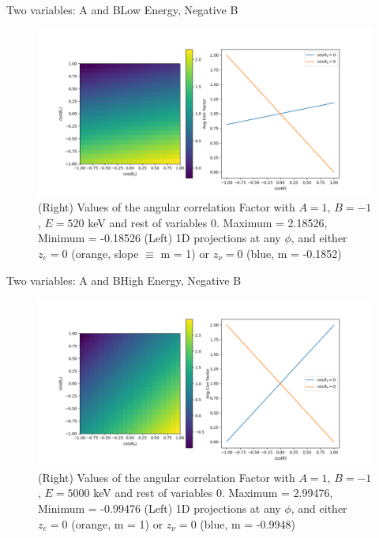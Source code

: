 \documentclass{beamer}
\begin{document}
\begin{frame}{Two variables: A and B}{Low Energy, Negative B}
	\begin{figure}
		\centering
		\includegraphics[width=0.8\paperwidth]{plots/posA_negB_lowE.png}
		\caption{(Right) Values of the angular correlation Factor with $A = 1$, $B = -1$, $E = 520$ keV and rest of variables 0. Maximum = 2.18526, Minimum = -0.18526 (Left) 1D projections at any $\phi$, and either $z_e = 0$ (orange, slope $\equiv$ m = 1) or $z_\nu = 0$ (blue, m = -0.1852)}	
	\end{figure}
\end{frame}
\begin{frame}{Two variables: A and B}{High Energy, Negative B}
	\begin{figure}
		\centering
		\includegraphics[width=0.8\paperwidth]{plots/posA_negB_hiE.png}
		\caption{(Right) Values of the angular correlation Factor with $A = 1$, $B = -1$, $E = 5000$ keV and rest of variables 0. Maximum = 2.99476, Minimum = -0.99476 (Left) 1D projections at any $\phi$, and either $z_e = 0$ (orange, m = 1) or $z_\nu = 0$ (blue, m = -0.9948)}	
	\end{figure}
\end{frame}
\end{document}
